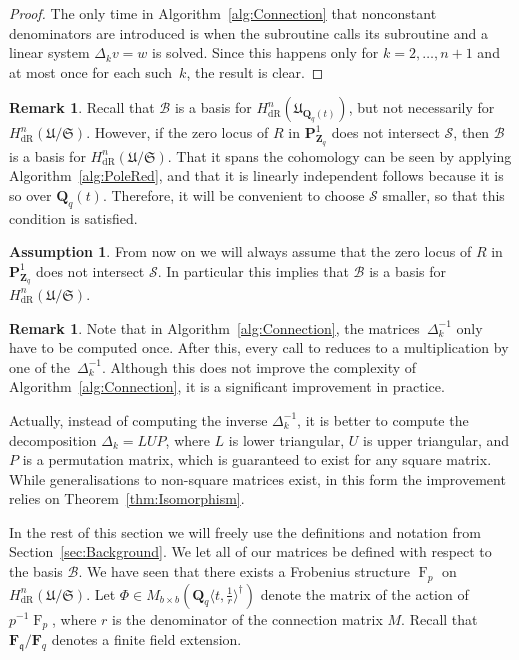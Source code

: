 \documentclass[a4paper,11pt]{article}
\numberwithin{equation}{section}
\newcommand{\ZZ}{\mathbf{Z}} %
\newcommand{\QQ}{\mathbf{Q}} %
\newcommand{\FF}{\mathbf{F}} %
\DeclareMathOperator{\Frob}{F}           %
\providecommand{\HdR}{H_{\text{dR}}}    %
\providecommand{\cB}{\mathcal{B}} %
\theoremstyle{definition}
\newtheorem{rem}[thm]{Remark}
\newtheorem{assump}[thm]{Assumption}
\begin{document}
\begin{proof}
The only time in Algorithm~\ref{alg:Connection} that nonconstant denominators 
are introduced is when the subroutine {} calls its subroutine 
{} and a linear system $\Delta_k v = w$ is solved. Since this 
happens only for $k=2, \dotsc, n+1$ and at most once for each 
such~$k$, the result is clear.
\end{proof}

\begin{rem}
Recall that $\cB$ is a basis for $\HdR^n(\mathfrak{U}_{\QQ_q(t)})$, but not
necessarily for $\HdR^n(\mathfrak{U}/\mathfrak{S})$. However, if the zero locus
of $R$ in $\mathbf{P}^1_{\ZZ_q}$ does not intersect $\mathcal{S}$, then $\cB$ is 
a basis for $\HdR^n(\mathfrak{U}/\mathfrak{S})$. That it 
spans the cohomology can be seen by applying Algorithm~\ref{alg:PoleRed}, and that it 
is linearly independent follows because it is so over $\QQ_q(t)$. Therefore, it will 
be convenient to choose $\mathcal{S}$ smaller, so that this condition is satisfied. 
\end{rem}

\begin{assump} \label{assump:R}
From now on we will always assume that the zero locus of $R$ in 
$\mathbf{P}^1_{\ZZ_q}$ does not intersect $\mathcal{S}$. In particular
this implies that $\cB$ is a basis for $\HdR^n(\mathfrak{U}/\mathfrak{S})$.
\end{assump}

\begin{rem} 
Note that in Algorithm~\ref{alg:Connection}, the matrices~$\Delta_k^{-1}$ 
only have to be computed once. After this, every call to {} 
reduces to a multiplication by one of the~$\Delta_k^{-1}$.  Although this 
does not improve the complexity of Algorithm~\ref{alg:Connection}, it is 
a significant improvement in practice.

Actually, instead of computing the inverse $\Delta_k^{-1}$, it is better 
to compute the decomposition $\Delta_k = L U P$, where $L$ is lower 
triangular, $U$ is upper triangular, and $P$ is a permutation matrix, which 
is guaranteed to exist for any square matrix.  While generalisations to 
non-square matrices exist, in this form the improvement relies on 
Theorem~\ref{thm:Isomorphism}.
\end{rem}

In the rest of this section we will freely use the definitions and notation 
from Section~\ref{sec:Background}. We let all of our matrices be defined with 
respect to the basis $\cB$. We have seen that there exists a Frobenius 
structure $\Frob_p$ on $\HdR^n(\mathfrak{U}/\mathfrak{S})$. Let 
$\Phi \in M_{b \times b}(\QQ_q \langle t, \frac{1}{r} \rangle^{\dag})$ 
denote the matrix of the action of $p^{-1}\Frob_p$, where $r$ is the 
denominator of the connection matrix $M$. Recall that 
$\FF_{\mathfrak{q}}/\FF_q$ 
denotes a finite field extension. 
\end{document}
